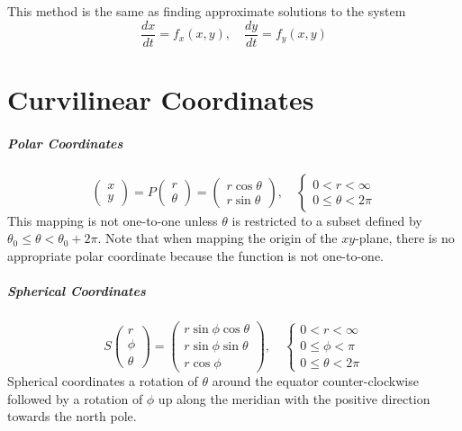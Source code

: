 \documentclass[11pt]{article}
\begin{document}
		This method is the same as finding approximate solutions to the system
		\begin{equation}
			\frac{dx}{dt} = f_x(x, y), \quad \frac{dy}{dt} = f_y(x, y)
		\end{equation}
		
\section{Curvilinear Coordinates}
	\subparagraph{Polar Coordinates}
		\begin{equation}
			\begin{pmatrix}
				x\\y
			\end{pmatrix}
			= P \begin{pmatrix}
				r\\\theta
			\end{pmatrix}
			= \begin{pmatrix}
				r\cos \theta\\
				r\sin \theta
			\end{pmatrix}, \quad
			\left\lbrace
			\begin{matrix}
				0 < r < \infty\\
				0 \leq \theta < 2\pi
			\end{matrix}
			\right.
		\end{equation}
		This mapping is not one-to-one unless $\theta$ is restricted to a subset defined by $\theta_0 \leq \theta < \theta_0 + 2\pi$. Note that when mapping the origin of the $xy$-plane, there is no appropriate polar coordinate because the function is not one-to-one. 
		
	\subparagraph{Spherical Coordinates}
		\begin{equation}
			S \begin{pmatrix}
				r\\\phi\\\theta
			\end{pmatrix}
			= \begin{pmatrix}
				r\sin\phi\cos\theta\\
				r\sin\phi\sin\theta\\
				r\cos\phi
			\end{pmatrix}, \quad
			\left\lbrace
			\begin{matrix}
				0 < r < \infty\\
				0 \leq \phi < \pi\\
				0 \leq \theta < 2\pi
			\end{matrix}
			\right.
		\end{equation}
		Spherical coordinates a rotation of $\theta$ around the equator counter-clockwise followed by a rotation of $\phi$ up along the meridian with the positive direction towards the north pole.
		
\end{document}
